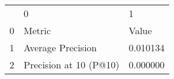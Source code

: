 \begin{tabular}{lll}
 & 0 & 1 \\
0 & Metric & Value \\
1 & Average Precision & 0.010134 \\
2 & Precision at 10 (P@10) & 0.000000 \\
\end{tabular}
